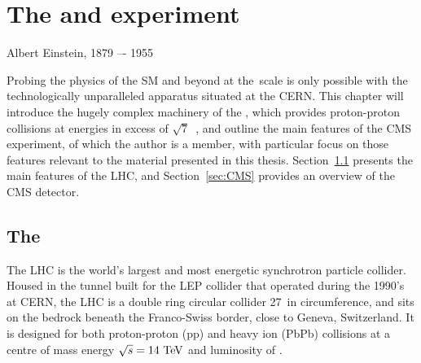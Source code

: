 
\chapter{The \LHC and \CMS experiment}
\label{chap:detector}

{Albert Einstein, 1879 –- 1955}

Probing the physics of the \ac{SM} and beyond at the~\TeV scale is only possible with the technologically unparalleled apparatus situated at the \ac{CERN}.
This chapter will introduce the hugely complex machinery of the \LHC, 
which provides proton-proton collisions at energies in excess of $\sqrt{7}$~\TeV, 
and outline the main features of the \ac{CMS} experiment, of which the author is a member, 
with particular focus on those features relevant to the material presented in this thesis.
%
Section~\ref{sec:LHC} presents the main features of the \ac{LHC}, and Section~\ref{sec:CMS} provides an overview of the \ac{CMS}  detector. 


\section{The \LHC}
\label{sec:LHC}
The \ac{LHC} is the world's largest and most energetic synchrotron particle collider. 
Housed in the tunnel built for the \ac{LEP} collider that operated during the 1990's at \ac{CERN}, 
the \ac{LHC} is a double ring circular collider 27~\km in circumference, 
and sits on the bedrock beneath the Franco-Swiss border, close to Geneva, Switzerland. 
It is designed for both proton-proton (pp) and heavy ion (PbPb) collisions at a centre of mass energy $\sqrt{s} = 14~\mathrm{TeV}$ and luminosity of \designLumi.


